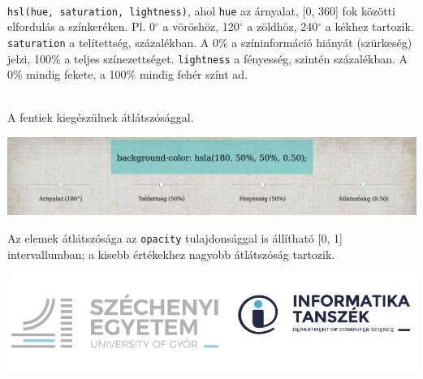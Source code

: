 \begin{frame}
  \begin{description}[m]
    \item[\texttt{hsl()} függvénnyel] \hfill \\ \texttt{hsl(hue, 
    saturation, lightness)}, ahol \texttt{hue} az árnyalat, [0, 360] 
    fok közötti elfordulás a színkeréken. Pl. 0$^{\circ}$ a 
    vöröshöz, 120$^{\circ}$ a zöldhöz, 240$^{\circ}$ a kékhez 
    tartozik. \texttt{saturation} a telítettség, százalékban. A 0\% 
    a színinformáció hiányát (szürkeség) jelzi, 100\% a teljes 
    színezettséget. \texttt{lightness} a fényesség, szintén 
    százalékban. A 0\% mindig fekete, a 100\% mindig fehér színt ad.
    \item[\texttt{hsla()} függvénnyel] \hfill \\ A fentiek 
    kiegészülnek átlátszósággal.
  \end{description}
  \vfill
  \begin{center}
    \includegraphics[scale=0.2]{szinek2.png}\\
  \end{center}
\end{frame}

\begin{frame}
  Az elemek átlátszósága az \texttt{opacity} tulajdonsággal is állítható [0, 1] intervallumban; a kisebb értékekhez nagyobb átlátszóság tartozik.
  \begin{exampleblock}{}
    \scriptsize
    
    
  \end{exampleblock}
  \begin{center}
    \includegraphics[width=.5\textwidth]{atlatszosag1.png}
  \end{center}
\end{frame}

